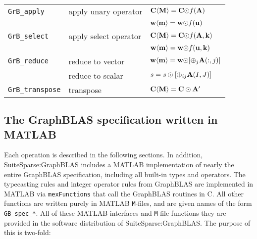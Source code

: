 \documentclass[12pt]{article}
\begin{document}
{\begin{tabular}{lll}
\hline
\verb'GrB_apply'     & apply unary operator    & ${\bf C \langle M \rangle = C \odot} f{\bf (A)}$ \\
                     &                         & ${\bf w \langle m \rangle = w \odot} f{\bf (u)}$ \\
\hline
\verb'GrB_select'    & apply select operator   & ${\bf C \langle M \rangle = C \odot} f{\bf (A,k)}$ \\
                     &                         & ${\bf w \langle m \rangle = w \odot} f{\bf (u,k)}$ \\
\hline
\verb'GrB_reduce'    & reduce to vector        & ${\bf w \langle m \rangle = w \odot} [{\oplus}_j {\bf A}(:,j)]$ \\
                     & reduce to scalar        & $s = s \odot [{\oplus}_{ij}  {\bf A}(I,J)]$ \\
\hline
\verb'GrB_transpose' & transpose               & ${\bf C \langle M \rangle = C \odot A'}$ \\
\hline
\end{tabular}
}
\vspace{0.2in}




\newpage
\subsection{The GraphBLAS specification written in {MATLAB}} %
\label{spec}

Each operation is described in the following sections.  In addition,
SuiteSparse:GraphBLAS includes a MATLAB implementation of nearly the entire
GraphBLAS specification, including all built-in types and operators.  The
typecasting rules and integer operator rules from GraphBLAS are implemented in
MATLAB via \verb'mexFunctions' that call the GraphBLAS routines in C.  All
other functions are written purely in MATLAB \verb'M'-files, and are given
names of the form \verb'GB_spec_*'.  All of these MATLAB interfaces and
\verb'M'-file functions they are provided in the software distribution of
SuiteSparse:GraphBLAS.  The purpose of this is two-fold:
\end{document}
